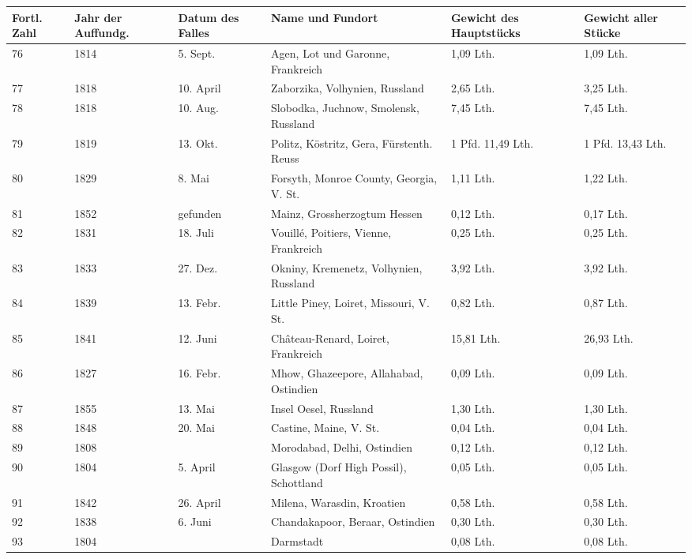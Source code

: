 \documentclass[a4paper, 11pt, oneside]{article}
\begin{document}
\begin{center}
\begin{footnotesize}
\begin{tabular}{ |p{7mm}|p{7mm}|p{13mm}|p{48mm}|p{22mm}|p{22mm}| }
    \hline
    Fortl. Zahl & Jahr der Auffundg. & Datum des Falles & Name und Fundort & Gewicht des Hauptstücks & Gewicht aller Stücke\\
    \hline\hline
    76 & 1814 & 5. Sept. & Agen, Lot und Garonne, Frankreich & 1,09 Lth. & 1,09 Lth.\\\hline
    77 & 1818 & 10. April & Zaborzika, Volhynien, Russland & 2,65 Lth. & 3,25 Lth.\\\hline
    78 & 1818 & 10. Aug. & Slobodka, Juchnow, Smolensk, Russland & 7,45 Lth. & 7,45 Lth.\\\hline
    79 & 1819 & 13. Okt. & Politz, Köstritz, Gera, Fürstenth. Reuss & 1 Pfd. 11,49 Lth. & 1 Pfd. 13,43 Lth.\\\hline
    80 & 1829 & 8. Mai & Forsyth, Monroe County, Georgia, V. St. & 1,11 Lth. & 1,22 Lth.\\\hline
    81 & 1852 & gefunden & Mainz, Grossherzogtum Hessen & 0,12 Lth. & 0,17 Lth.\\\hline
    82 & 1831 & 18. Juli & Vouillé, Poitiers, Vienne, Frankreich & 0,25 Lth. & 0,25 Lth.\\\hline
    83 & 1833 & 27. Dez. & Okniny, Kremenetz, Volhynien, Russland & 3,92 Lth. & 3,92 Lth.\\\hline
    84 & 1839 & 13. Febr. & Little Piney, Loiret, Missouri, V. St. & 0,82 Lth. & 0,87 Lth.\\\hline
    85 & 1841 & 12. Juni & Château-Renard, Loiret, Frankreich & 15,81 Lth. & 26,93 Lth.\\\hline
    86 & 1827 & 16. Febr. & Mhow, Ghazeepore, Allahabad, Ostindien & 0,09 Lth. & 0,09 Lth.\\\hline
    87 & 1855 & 13. Mai & Insel Oesel, Russland & 1,30 Lth. & 1,30 Lth.\\\hline
    88 & 1848 & 20. Mai & Castine, Maine, V. St. & 0,04 Lth. & 0,04 Lth.\\\hline
    89 & 1808 &  & Morodabad, Delhi, Ostindien & 0,12 Lth. & 0,12 Lth.\\\hline
    90 & 1804 & 5. April & Glasgow (Dorf High Possil), Schottland & 0,05 Lth. & 0,05 Lth.\\\hline
    91 & 1842 & 26. April & Milena, Warasdin, Kroatien & 0,58 Lth. & 0,58 Lth.\\\hline
    92 & 1838 & 6. Juni & Chandakapoor, Beraar, Ostindien & 0,30 Lth. & 0,30 Lth.\\\hline
    93 & 1804 &  & Darmstadt & 0,08 Lth. & 0,08 Lth.\\
    \hline
\end{tabular}
\end{footnotesize}
\end{center}
\end{document}
